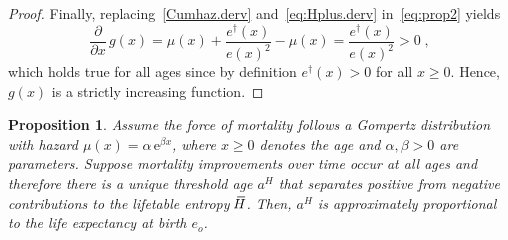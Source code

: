 \documentclass[a4paper,twoside, openright, 12pt, leqno]{article}
\newcommand*\xbar[1]{%
   \hbox{%
     \vbox{%
       \hrule height 0.5pt %
       \kern0.3ex%
       \hbox{%
         \kern-0.28em%
         \ensuremath{#1}%
         \kern-0.05em%
       }%
     }%
   }%
}
\newtheorem{theorem}{Proposition}
\begin{document}
\begin{proof}
Finally, replacing~\eqref{Cumhaz.derv} and~\eqref{eq:Hplus.derv} in~\eqref{eq:prop2} yields
%
\begin{equation*}
 \frac{\partial}{\partial x}\,g(x)=\mu(x)+\frac{e^\dagger(x)}{e(x)^2}-\mu(x)=\frac{e^\dagger(x)}{e(x)^2}>0\;,
\end{equation*}
%
which holds true for all ages since by definition $e^\dagger(x)>0$ for all $x\geq0$. Hence, $g(x)$ is a strictly increasing function.
\end{proof}

\begin{theorem}
  Assume the force of mortality follows a Gompertz distribution with hazard $\mu(x) = \alpha\,\mathrm{e}^{\beta x}$, where $x\geq0$ denotes the age and $\alpha,\beta>0$ are parameters. Suppose mortality improvements over time occur at all ages and therefore there is a unique threshold age $a^H$ that separates positive from negative contributions to the lifetable entropy $\,\xbar{H}$. Then, $a^H$ is approximately proportional to the life expectancy at birth $e_o$. 
 \label{prop3}
\end{theorem}
\end{document}
